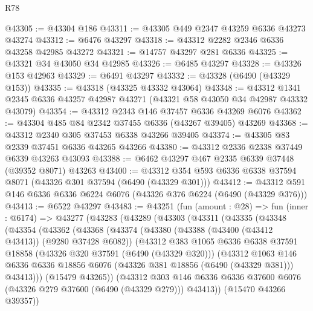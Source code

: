 \begin{lexlean}{R78}
\begin{coremodule}
@43305 := @43304 @186
@43311 := @43305 @449 @2347 @43259 @6336 @43273 @43274
@43312 := @6476 @43297
@43318 := @43312 @2282 @2346 @6336 @43258 @42985 @43272
@43321 := @14757 @43297 @281 @6336
@43325 := @43321 @34 @43050 @34 @42985
@43326 := @6485 @43297
@43328 := @43326 @153 @42963
@43329 := @6491 @43297
@43332 := @43328 (@6490 (@43329 @153))
@43335 := @43318 (@43325 @43332 @43064)
@43348 := @43312 @1341 @2345 @6336 @43257 @42987 @43271 (@43321 @58 @43050 @34 @42987 @43332 @43079)
@43354 := @43312 @2343 @146 @37457 @6336 @43269 @6076
@43362 := @43304 @485 @84 @2342 @37455 @6336 (@43267 @39405) @43269
@43368 := @43312 @2340 @305 @37453 @6338 @43266 @39405
@43374 := @43305 @83 @2339 @37451 @6336 @43265 @43266
@43380 := @43312 @2336 @2338 @37449 @6339 @43263 @43093
@43388 := @6462 @43297 @467 @2335 @6339 @37448 (@39352 @8071) @43263
@43400 := @43312 @354 @593 @6336 @6338 @37594 @8071 (@43326 @301 @37594 (@6490 (@43329 @301)))
@43412 := @43312 @591 @146 @6336 @6336 @6224 @6076 (@43326 @376 @6224 (@6490 (@43329 @376)))
@43413 := @6522 @43297
@43483 := @43251
    (fun (amount : @28) =>
    fun (inner : @6174) =>
    @43277
      (@43283
        (@43289
          (@43303
            (@43311
              (@43335
                (@43348
                  (@43354
                    (@43362
                      (@43368
                        (@43374
                          (@43380
                            (@43388 (@43400 (@43412 @43413)) (@9280 @37428 @6082))
                            (@43312
                              @383
                              @1065
                              @6336
                              @6338
                              @37591
                              @18858
                              (@43326 @320 @37591 (@6490 (@43329 @320)))
                              (@43312
                                @1063
                                @146
                                @6336
                                @6336
                                @18856
                                @6076
                                (@43326 @381 @18856 (@6490 (@43329 @381)))
                                @43413)))
                          (@15479 @43265))
                        (@43312
                          @303
                          @146
                          @6336
                          @6336
                          @37600
                          @6076
                          (@43326 @279 @37600 (@6490 (@43329 @279)))
                          @43413))
                      (@15470 @43266 @39357))

\end{coremodule}
\end{lexlean}
